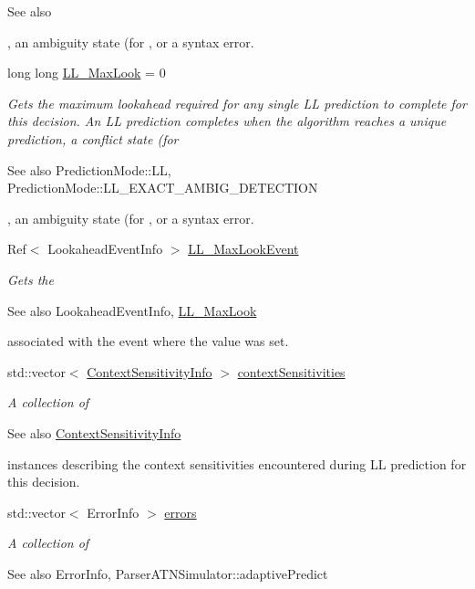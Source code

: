 \begin{DoxyCompactItemize}
\begin{DoxyCompactList}
\begin{DoxySeeAlso}{See also}
\end{DoxySeeAlso}
, an ambiguity state (for , or a syntax error. \end{DoxyCompactList}\item 
long long \hyperlink{classantlr4_1_1atn_1_1DecisionInfo_a38f6ee6c6bbed06adae2df60f11dd705}{L\+L\+\_\+\+Max\+Look} = 0
\begin{DoxyCompactList}\small\item\em Gets the maximum lookahead required for any single LL prediction to complete for this decision. An LL prediction completes when the algorithm reaches a unique prediction, a conflict state (for \begin{DoxySeeAlso}{See also}
Prediction\+Mode\+::\+LL, Prediction\+Mode\+::\+L\+L\+\_\+\+E\+X\+A\+C\+T\+\_\+\+A\+M\+B\+I\+G\+\_\+\+D\+E\+T\+E\+C\+T\+I\+ON


\end{DoxySeeAlso}
, an ambiguity state (for , or a syntax error. \end{DoxyCompactList}\item 
Ref$<$ Lookahead\+Event\+Info $>$ \hyperlink{classantlr4_1_1atn_1_1DecisionInfo_a1ddd46ba432cca67892ebbf1263cef6d}{L\+L\+\_\+\+Max\+Look\+Event}
\begin{DoxyCompactList}\small\item\em Gets the \begin{DoxySeeAlso}{See also}
Lookahead\+Event\+Info, \hyperlink{classantlr4_1_1atn_1_1DecisionInfo_a38f6ee6c6bbed06adae2df60f11dd705}{L\+L\+\_\+\+Max\+Look}


\end{DoxySeeAlso}
associated with the event where the  value was set. \end{DoxyCompactList}\item 
std\+::vector$<$ \hyperlink{classantlr4_1_1atn_1_1ContextSensitivityInfo}{Context\+Sensitivity\+Info} $>$ \hyperlink{classantlr4_1_1atn_1_1DecisionInfo_a607bcd881761a0c502f3511d840c1c16}{context\+Sensitivities}
\begin{DoxyCompactList}\small\item\em A collection of \begin{DoxySeeAlso}{See also}
\hyperlink{classantlr4_1_1atn_1_1ContextSensitivityInfo}{Context\+Sensitivity\+Info}


\end{DoxySeeAlso}
instances describing the context sensitivities encountered during LL prediction for this decision. \end{DoxyCompactList}\item 
std\+::vector$<$ Error\+Info $>$ \hyperlink{classantlr4_1_1atn_1_1DecisionInfo_a38e19d544a49e811de5e3aaa762bc1c2}{errors}
\begin{DoxyCompactList}\small\item\em A collection of \begin{DoxySeeAlso}{See also}
Error\+Info, Parser\+A\+T\+N\+Simulator\+::adaptive\+Predict



\end{DoxySeeAlso}
\end{DoxyCompactList}
\end{DoxyCompactItemize}
